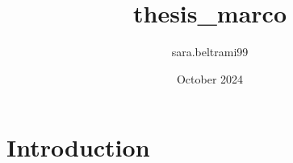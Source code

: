 \documentclass{article}
\title{thesis_marco}
\author{sara.beltrami99 }
\date{October 2024}
\begin{document}
\maketitle

\section{Introduction}
\end{document}
